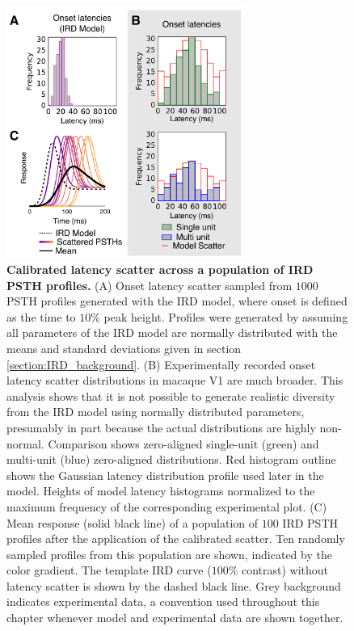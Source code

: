 \documentclass[phd,ianc,twoside]{infthesis}
\begin{document}
\begin{figure}
\center
\includegraphics[width=0.7\textwidth]{./figures/sird_calibration_latency_scatter_curves.pdf}
\caption{{\bf Calibrated latency scatter across a population of IRD PSTH
    profiles.}  (A) Onset latency scatter sampled from $1000$ PSTH
  profiles generated with the IRD model, where onset is defined as the
  time to $10\%$ peak height. Profiles were generated by assuming all
  parameters of the IRD model are normally distributed with the means
  and standard deviations given in section \ref{section:IRD_background}.
  (B) Experimentally recorded onset latency scatter distributions in
  macaque V1 \citep{nowak_visneuro95} are much broader. This analysis
  shows that it is not possible to generate realistic diversity from
  the IRD model using normally distributed parameters, presumably in
  part because the actual distributions are highly non-normal.
  Comparison shows zero-aligned single-unit (green) and
  multi-unit (blue) zero-aligned distributions.  Red histogram outline
  shows the Gaussian latency distribution profile used later in the
  model. Heights of model latency histograms normalized to the maximum
  frequency of the corresponding experimental plot. (C) Mean response
  (solid black line) of a population of $100$ IRD PSTH profiles after
  the application of the calibrated scatter. Ten randomly sampled
  profiles from this population are shown, indicated by the color
  gradient. The template IRD curve ($100\%$ contrast) without latency
  scatter is shown by the dashed black line.  Grey background indicates
  experimental data, a convention used throughout this chapter whenever
  model and experimental data are shown together.  }
\label{fig:sird_calibration_latency_scatter}
\end{figure}
\end{document}
